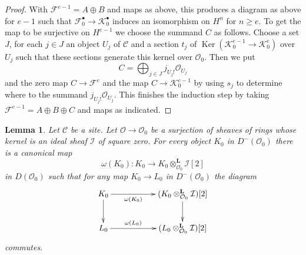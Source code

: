 \documentclass{stacks-project}
\theoremstyle{plain}
\newtheorem{lemma}[subsection]{Lemma}
\theoremstyle{definition}
\theoremstyle{remark}
\numberwithin{equation}{subsection}
\def\Ker{\mathop{\mathrm{Ker}}}
\begin{document}
\begin{proof}
\medskip\noindent
With $\mathcal{F}^{e - 1} = A \oplus B$ and maps as above,
this produces a diagram as above for $e - 1$ such that
$\mathcal{F}_0^\bullet \to \mathcal{K}_0^\bullet$
induces an isomorphism on $H^n$ for $n \geq e$.
To get the map to be surjective on $H^{e - 1}$ we choose
the summand $C$ as follows.
Choose a set $J$, for each $j \in J$ an object $U_j$ of $\mathcal{C}$
and a section $t_j$ of $\Ker(\mathcal{K}^{e - 1}_0 \to \mathcal{K}^e_0)$
over $U_j$ such that these sections generate this kernel over
$\mathcal{O}_0$. Then we put
$$
C = \bigoplus\nolimits_{j \in J} j_{U_j!}\mathcal{O}_{U_j}
$$
and the zero map $C \to \mathcal{F}^e$ and the map
$C \to \mathcal{K}_0^{e - 1}$ by using $s_j$ to determine where to the summand
$j_{U_j!}\mathcal{O}_{U_j}$. This finishes the induction step
by taking $\mathcal{F}^{e - 1} = A \oplus B \oplus C$ and
maps as indicated.
\end{proof}

\begin{lemma}
\label{lemma-canonical-class}
Let $\mathcal{C}$ be a site. Let $\mathcal{O} \to \mathcal{O}_0$
be a surjection of sheaves of rings whose kernel is an ideal sheaf
$\mathcal{I}$ of square zero. For every object
$K_0$ in $D^-(\mathcal{O}_0)$ there is a canonical map
$$
\omega(K_0) :
K_0 \longrightarrow
K_0 \otimes_{\mathcal{O}_0}^\mathbf{L} \mathcal{I}[2]
$$
in $D(\mathcal{O}_0)$ such that for any map
$K_0 \to L_0$ in $D^-(\mathcal{O}_0)$ the diagram
$$
\xymatrix{
K_0 \ar[d] \ar[rr]_-{\omega(K_0)} & &
(K_0 \otimes^\mathbf{L}_{\mathcal{O}_0} \mathcal{I})[2] \ar[d] \\
L_0 \ar[rr]^-{\omega(L_0)} & &
(L_0 \otimes^\mathbf{L}_{\mathcal{O}_0} \mathcal{I})[2]
}
$$
commutes.
\end{lemma}
\end{document}
